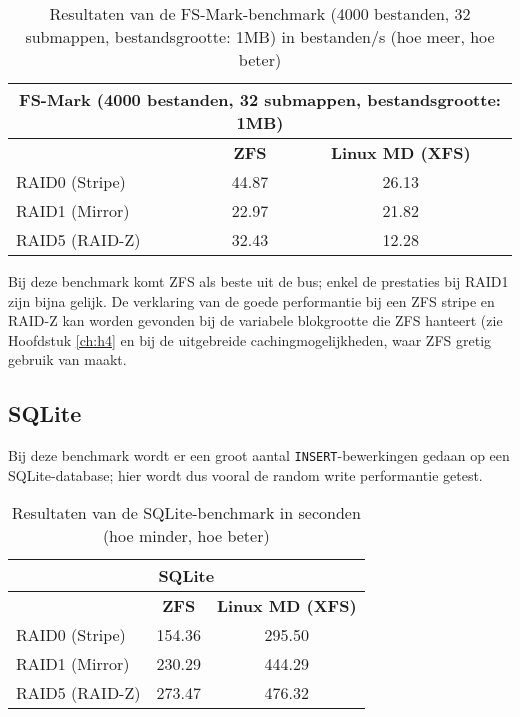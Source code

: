 \begin{table}[h]
  \centering
  \begin{tabular}{l || c | c }
    \hline
    \multicolumn{3}{c}{\textbf{FS-Mark (4000 bestanden, 32 submappen, bestandsgrootte: 1MB)}} \\
    \hline
    & \textbf{ZFS} & \textbf{Linux MD (XFS)} \\
    \hline
    RAID0 (Stripe) & 44.87 & 26.13 \\
    RAID1 (Mirror) & 22.97 & 21.82 \\
    RAID5 (RAID-Z) & 32.43 & 12.28 \\
  \end{tabular}
  \caption{Resultaten van de FS-Mark-benchmark (4000 bestanden, 32 submappen, bestandsgrootte: 1MB) in bestanden/s (hoe meer, hoe beter)}
  \label{tab:results_fmark}
\end{table}

Bij deze benchmark komt ZFS als beste uit de bus; enkel de prestaties bij RAID1 zijn bijna gelijk. De verklaring van de goede performantie bij een ZFS stripe en RAID-Z kan worden gevonden bij de variabele blokgrootte die ZFS hanteert (zie Hoofdstuk \ref{ch:h4} en bij de uitgebreide cachingmogelijkheden, waar ZFS gretig gebruik van maakt. 

\subsection{SQLite}

Bij deze benchmark wordt er een groot aantal \texttt{INSERT}-bewerkingen gedaan op een SQLite-database; hier wordt dus vooral de random write performantie getest.

\begin{table}[h]
  \centering
  \begin{tabular}{l || c | c }
    \hline
    \multicolumn{3}{c}{\textbf{SQLite}} \\
    \hline
    & \textbf{ZFS} & \textbf{Linux MD (XFS)} \\
    \hline
    RAID0 (Stripe) & 154.36 & 295.50 \\
    RAID1 (Mirror) & 230.29 & 444.29 \\
    RAID5 (RAID-Z) & 273.47 & 476.32 \\
  \end{tabular}
  \caption{Resultaten van de SQLite-benchmark in seconden (hoe minder, hoe beter)}
  \label{tab:results_sqlite}
\end{table}

